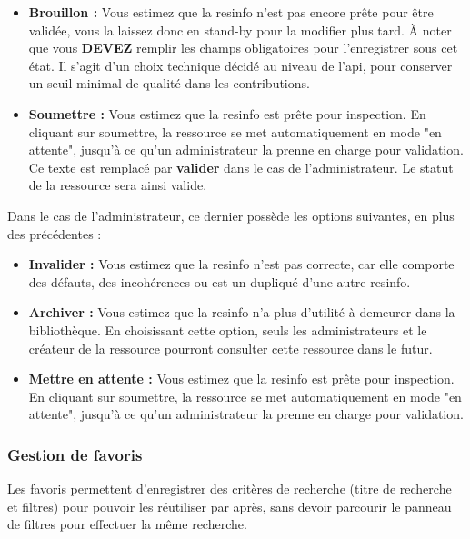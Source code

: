 \begin{itemize}
    \item \textbf{Brouillon :} Vous estimez que la \gls{resinfo} n'est pas encore prête pour être validée, vous la laissez donc en stand-by pour la modifier plus tard. À noter que vous \textbf{DEVEZ} remplir les champs obligatoires pour l'enregistrer sous cet état. Il s'agit d'un choix technique décidé au niveau de l'\gls{api}, pour conserver un seuil minimal de qualité dans les contributions.
    \item \textbf{Soumettre :} Vous estimez que la \gls{resinfo} est prête pour inspection. En cliquant sur soumettre, la ressource se met automatiquement en mode "en attente", jusqu'à ce qu'un administrateur la prenne en charge pour validation. Ce texte est remplacé par \textbf{valider} dans le cas de l'administrateur. Le statut de la ressource sera ainsi valide.
\end{itemize}

Dans le cas de l'administrateur, ce dernier possède les options suivantes, en plus des précédentes :

\begin{itemize}
    \item \textbf{Invalider :} Vous estimez que la \gls{resinfo} n'est pas correcte, car elle comporte des défauts, des incohérences ou est un dupliqué d'une autre \gls{resinfo}.
    \item \textbf{Archiver :} Vous estimez que la \gls{resinfo} n'a plus d'utilité à demeurer dans la bibliothèque. En choisissant cette option, seuls les administrateurs et le créateur de la ressource pourront consulter cette ressource dans le futur.
    \item \textbf{Mettre en attente :} Vous estimez que la \gls{resinfo} est prête pour inspection. En cliquant sur soumettre, la ressource se met automatiquement en mode "en attente", jusqu'à ce qu'un administrateur la prenne en charge pour validation.
\end{itemize}

\subsubsection{Gestion de favoris}
\label{section:gestionFavorite}

Les favoris permettent d'enregistrer des critères de recherche (titre de recherche et filtres) pour pouvoir les réutiliser par après, sans devoir parcourir le panneau de filtres pour effectuer la même recherche.\\

